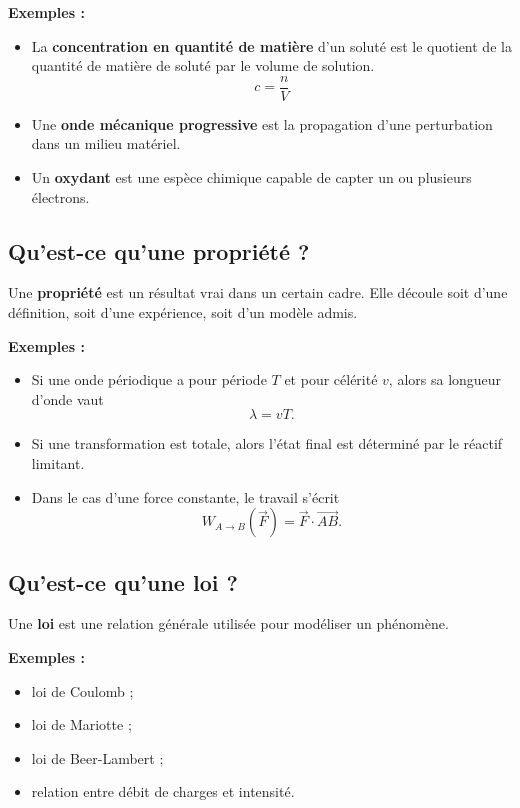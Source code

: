 \documentclass[11pt,a4paper]{article}
\begin{document}
\textbf{Exemples :}
\begin{itemize}
    \item La \textbf{concentration en quantité de matière} d'un soluté est le quotient de la quantité de matière de soluté par le volume de solution.
    \[
    c=\frac{n}{V}
    \]
    \item Une \textbf{onde mécanique progressive} est la propagation d'une perturbation dans un milieu matériel.
    \item Un \textbf{oxydant} est une espèce chimique capable de capter un ou plusieurs électrons.
\end{itemize}

\subsection{Qu'est-ce qu'une propriété ?}

\begin{proprbox}
Une \textbf{propriété} est un résultat vrai dans un certain cadre.  
Elle découle soit d'une définition, soit d'une expérience, soit d'un modèle admis.
\end{proprbox}

\textbf{Exemples :}
\begin{itemize}
    \item Si une onde périodique a pour période \(T\) et pour célérité \(v\), alors sa longueur d'onde vaut
    \[
    \lambda=vT.
    \]
    \item Si une transformation est totale, alors l'état final est déterminé par le réactif limitant.
    \item Dans le cas d'une force constante, le travail s'écrit
    \[
    W_{A\to B}(\vec F)=\vec F\cdot \overrightarrow{AB}.
    \]
\end{itemize}

\subsection{Qu'est-ce qu'une loi ?}

\begin{definitionbox}
Une \textbf{loi} est une relation générale utilisée pour modéliser un phénomène.
\end{definitionbox}

\textbf{Exemples :}
\begin{itemize}
    \item loi de Coulomb ;
    \item loi de Mariotte ;
    \item loi de Beer-Lambert ;
    \item relation entre débit de charges et intensité.
\end{itemize}
\end{document}
